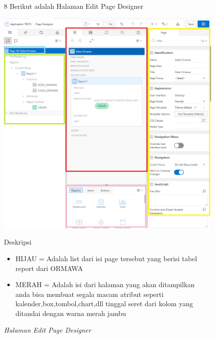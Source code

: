 \begin{itemize}
        \begin{figure}[!htbp]
        \item[8]Berikut adalah Halaman Edit Page Designer
        \begin{center}
        \includegraphics[scale=0.45]{figures/halaman_page_designer.png}
        \caption{\textit{Halaman Edit Page Designer}}
        \end{center}
        Deskripsi
        \begin{itemize}
            \item  HIJAU = Adalah list dari isi page tersebut yang berisi tabel report dari ORMAWA
            \item  MERAH = Adalah isi dari halaman yang akan ditampilkan anda bisa membuat segala macam atribut seperti kalender,box,tombol,chart,dll tinggal seret dari kolom yang ditandai dengan warna merah jambu
        \end{itemize}
        \end{figure}
    

\end{itemize}
